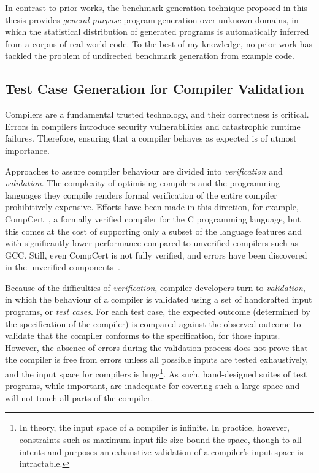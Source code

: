 In contrast to prior works, the benchmark generation technique proposed in this thesis provides \emph{general-purpose} program generation over unknown domains, in which the statistical distribution of generated programs is automatically inferred from a corpus of real-world code. To the best of my knowledge, no prior work has tackled the problem of undirected benchmark generation from example code.


\subsection{Test Case Generation for Compiler Validation}

Compilers are a fundamental trusted technology, and their correctness is critical. Errors in compilers introduce security vulnerabilities and catastrophic runtime failures. Therefore, ensuring that a compiler behaves as expected is of utmost importance.

Approaches to assure compiler behaviour are divided into \emph{verification} and \emph{validation}. The complexity of optimising compilers and the programming languages they compile renders formal verification of the entire compiler prohibitively expensive. Efforts have been made in this direction, for example, CompCert~\cite{Leroy2013}, a formally verified compiler for the C programming language, but this comes at the cost of supporting only a subset of the language features and with significantly lower performance compared to unverified compilers such as GCC. Still, even CompCert is not fully verified, and errors have been discovered in the unverified components~\cite{Yang2011}.

Because of the difficulties of \emph{verification}, compiler developers turn to \emph{validation}, in which the behaviour of a compiler is validated using a set of handcrafted input programs, or \emph{test cases}. For each test case, the expected outcome (determined by the specification of the compiler) is compared against the observed outcome to validate that the compiler conforms to the specification, for those inputs. However, the absence of errors during the validation process does not prove that the compiler is free from errors unless all possible inputs are tested exhaustively, and the input space for compilers is huge\footnote{In theory, the input space of a compiler is infinite. In practice, however, constraints such as maximum input file size bound the space, though to all intents and purposes an exhaustive validation of a compiler's input space is intractable.}. As such, hand-designed suites of test programs, while important, are inadequate for covering such a large space and will not touch all parts of the compiler.

